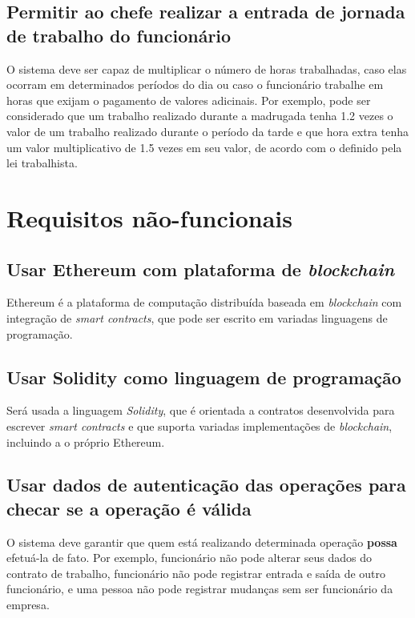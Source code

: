 \documentclass{article}
\begin{document}
\subsection{Permitir ao chefe realizar a entrada de jornada de trabalho do
funcionário}
O sistema deve ser capaz de multiplicar o número de horas trabalhadas, caso
elas ocorram em determinados períodos do dia ou caso o funcionário trabalhe em
horas que exijam o pagamento de valores adicinais.  Por exemplo, pode ser
considerado que um trabalho realizado durante a madrugada tenha 1.2 vezes o
valor de um trabalho realizado durante o período da tarde e que hora extra
tenha um valor multiplicativo de 1.5 vezes em seu valor, de acordo com o
definido pela lei trabalhista.

\section{Requisitos não-funcionais}

\subsection{Usar Ethereum com plataforma de \textit{blockchain}}
Ethereum é a plataforma de computação distribuída baseada em
\textit{blockchain} com integração de \textit{smart contracts}, que pode ser
escrito em variadas linguagens de programação.

\subsection{Usar Solidity como linguagem de programação}
Será usada a linguagem \textit{Solidity}, que é orientada a contratos
desenvolvida para escrever \textit{smart contracts} e que suporta variadas
implementações de \textit{blockchain}, incluindo a o próprio Ethereum.

\subsection{Usar dados de autenticação das operações para checar se a operação
é válida}
O sistema deve garantir que quem está realizando determinada operação
\textbf{possa} efetuá-la de fato. Por exemplo, funcionário não pode alterar
seus dados do contrato de trabalho, funcionário não pode registrar entrada e
saída de outro funcionário, e uma pessoa não pode registrar mudanças sem ser
funcionário da empresa.
\end{document}
